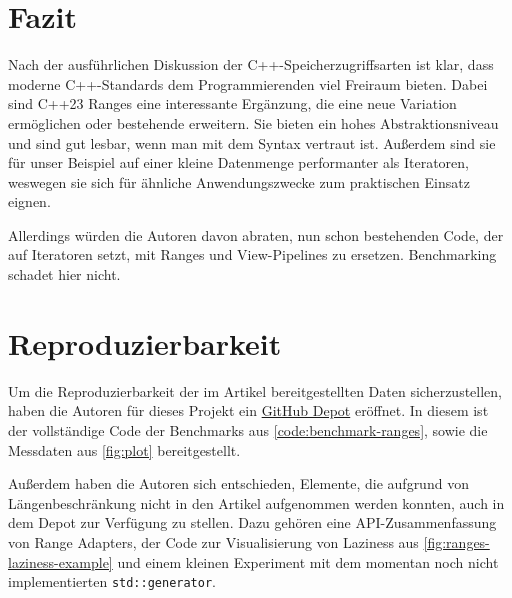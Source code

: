 \documentclass[runningheads]{llncs}
\begin{document}
\section{Fazit}

Nach der ausführlichen Diskussion der C++-Speicherzugriffsarten ist klar, dass moderne C++-Standards dem Programmierenden viel Freiraum bieten.
Dabei sind C++23 Ranges eine interessante Ergänzung, die eine neue Variation ermöglichen oder bestehende erweitern.
Sie bieten ein hohes Abstraktionsniveau und sind gut lesbar, wenn man mit dem Syntax vertraut ist.
Außerdem sind sie für unser Beispiel auf einer kleine Datenmenge performanter als Iteratoren, weswegen sie sich für ähnliche Anwendungszwecke zum praktischen Einsatz eignen.

Allerdings würden die Autoren davon abraten, nun schon bestehenden Code, der auf Iteratoren setzt, mit Ranges und View-Pipelines zu ersetzen.
Benchmarking schadet hier nicht.


\section*{Reproduzierbarkeit}

Um die Reproduzierbarkeit der im Artikel bereitgestellten Daten sicherzustellen, haben die Autoren für dieses Projekt ein \href{https://github.com/becknik/SeminarModernCpp}{GitHub Depot} eröffnet.
In diesem ist der vollständige Code der Benchmarks aus \autoref{code:benchmark-ranges}, sowie die Messdaten aus \autoref{fig:plot} bereitgestellt.

Außerdem haben die Autoren sich entschieden, Elemente, die aufgrund von Längenbeschränkung nicht in den Artikel aufgenommen werden konnten, auch in dem Depot zur Verfügung zu stellen.
Dazu gehören eine API-Zusammenfassung von Range Adapters, der Code zur Visualisierung von Laziness aus \autoref{fig:ranges-laziness-example} und einem kleinen Experiment mit dem momentan noch nicht implementierten \texttt{std::generator}.

\newpage
\printbibliography
\end{document}
